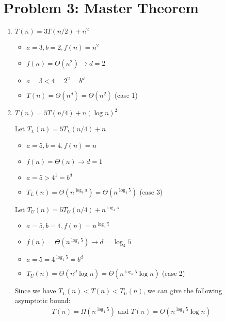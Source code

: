 \documentclass[11pt, a4paper, oneside]{memoir}
\begin{document}
\chapter{Problem 3: Master Theorem}
\begin{enumerate}
    \item \textbf{$T(n) = 3T(n/2) + n^2$}
    \begin{itemize}
        \item $a = 3, b = 2, f(n) = n^2$
        \item $f(n) = \Theta(n^2) \rightarrow d = 2$
        \item $a = 3 < 4 = 2^2 = b^d$
        \item $T(n) = \Theta(n^d) = \Theta(n^2)$ (case 1)
    \end{itemize}
    
    \item \textbf{$T(n) = 5T(n/4) + n(\log n)^2$}
    
    Let $T_L(n) = 5T_L(n/4) + n$
    \begin{itemize}
        \item $a = 5, b = 4, f(n) = n$
        \item $f(n) = \Theta(n) \rightarrow d = 1$
        \item $a = 5 > 4^1 = b^d$
        \item $T_L(n) = \Theta(n^{\log_b a}) = \Theta(n^{\log_4 5})$ (case 3)
    \end{itemize}
    Let $T_U(n) = 5T_U(n/4) + n^{\log_4 5}$
    \begin{itemize}
        \item $a = 5, b = 4, f(n) = n^{\log_4 5}$
        \item $f(n) = \Theta(n^{\log_4 5}) \rightarrow d = \log_4 5$
        \item $a = 5 = 4^{\log_4 5} = b^d$
        \item $T_U(n) = \Theta(n^d \log n) = \Theta(n^{\log_4 5} \log n)$ (case 2)
    \end{itemize}
    Since we have $T_L(n) < T(n) < T_U(n)$, we can give the following asymptotic bound:
    \begin{align*}
        T(n) = \Omega(n^{\log_4 5}) \text{ and } T(n) = O(n^{\log_4 5} \log n)
    \end{align*}


\end{enumerate}
\end{document}
